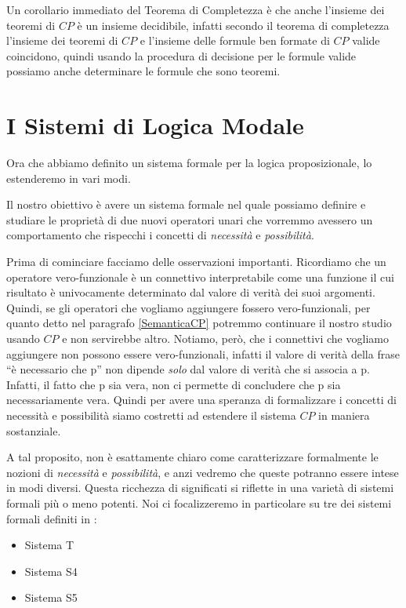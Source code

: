 \documentclass[a4paper, titlepage, 12pt]{report}
\begin{document}
Un corollario immediato del Teorema di Completezza è che anche l'insieme dei teoremi
di $CP$ è un insieme decidibile, infatti secondo il teorema di completezza
l'insieme dei teoremi di $CP$ e l'insieme delle formule ben formate di $CP$ valide
coincidono, quindi usando la procedura di decisione per le formule valide
possiamo anche determinare le formule che sono teoremi.

\chapter{I Sistemi di Logica Modale}

Ora che abbiamo definito un sistema formale per la logica proposizionale,
lo estenderemo in vari modi.

Il nostro obiettivo è avere un sistema formale nel quale possiamo definire e studiare
le proprietà di due nuovi operatori unari che vorremmo avessero un comportamento che rispecchi
i concetti di \emph{necessità} e \emph{possibilità}.

Prima di cominciare facciamo delle osservazioni importanti.
Ricordiamo che un operatore vero-funzionale è un connettivo
interpretabile come una funzione il cui risultato
è univocamente determinato dal valore di verità dei suoi argomenti.
Quindi, se gli operatori che vogliamo aggiungere fossero vero-funzionali,
per quanto detto nel paragrafo \ref{SemanticaCP} potremmo
continuare il nostro studio usando $CP$ e non servirebbe altro.
Notiamo, però, che i connettivi che vogliamo aggiungere non possono essere vero-funzionali,
infatti il valore di verità della frase ``è necessario che p'' non dipende \emph{solo}
dal valore di verità che si associa a p. Infatti, il fatto che p sia vera, non ci permette
di concludere che p sia necessariamente vera. Quindi per avere una speranza di formalizzare
i concetti di necessità e possibilità siamo costretti ad estendere il sistema $CP$
in maniera sostanziale.

A tal proposito, non è esattamente chiaro come caratterizzare formalmente
le nozioni di \emph{necessità} e \emph{possibilità},
e anzi vedremo che queste potranno essere intese in modi diversi.
Questa ricchezza di significati si riflette in una varietà di sistemi formali più o meno potenti.
Noi ci focalizzeremo in particolare su tre dei sistemi formali definiti in \cite{IntroModale}:
\begin{itemize}
\item Sistema T
\item Sistema S4
\item Sistema S5
\end{itemize}
\end{document}
